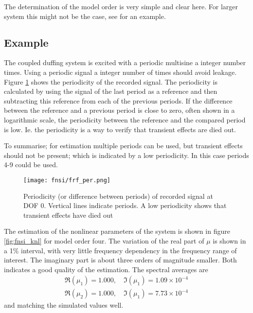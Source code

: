 The determination of the model order is very simple and clear here. For larger system this
might not be the case, see \autocite{noel2014a} for an example.


\subsection{Example}
\label{sec:fnsi_example}

The coupled duffing system is excited with a periodic multisine a integer
number times. Using a periodic signal a integer number of times should avoid
leakage\autocite{ewins2000a}.
Figure \ref{fig:periodicity} shows the periodicity of the recorded signal. The
periodicity is calculated by using the signal of the last period as a reference
and then subtracting this reference from each of the previous periods. If the
difference between the reference and a previous period is close to zero, often
shown in a logarithmic scale, the periodicity between the reference and the
compared period is low. Ie. the periodicity is a way to verify that transient
effects are died out.

To summarise; for estimation multiple periods can be used, but transient effects
should not be present; which is indicated by a low periodicity. In this case
periods 4-9 could be used.

\begin{figure}[!ht]
  \centering
  \texttt{[image: fnsi/frf\_per.png]}
  \caption{Periodicity (or difference between periods) of recorded signal at DOF
    0. Vertical lines indicate periods. A low periodicity shows that transient
    effects have died out}
  \label{fig:periodicity}
\end{figure}


The estimation of the nonlinear parameters of the system is shown in figure
\ref{fig:fnsi_knl} for model order four. The variation of the real part of $\mu$
is shown in a 1\% interval, with very little frequency dependency in the
frequency range of interest. The imaginary part is about three orders of
magnitude smaller. Both indicates a good quality of the estimation. The spectral
averages are
\begin{equation}
  \begin{aligned}
    \Re (\mu_1) = 1.000, \quad \Im (\mu_1) = 1.09 \times 10^{-4} \\
    \Re (\mu_2) = 1.000, \quad \Im (\mu_1) = 7.73 \times 10^{-4}
  \end{aligned}
\end{equation}
and matching the simulated values well.

